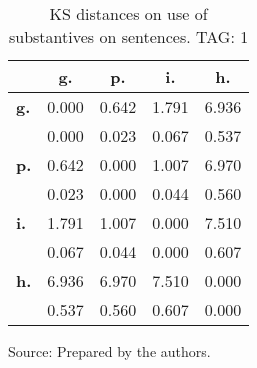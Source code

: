 \begin{table}[h!]
\begin{center}
\caption{KS distances on use of substantives on sentences. TAG: 1}
\begin{tabular}{| l || c | c | c | c |}\hline
 & {\bf g.} & {\bf p.} & {\bf i.} & {\bf h.} \\\hline\hline
{\bf g.} & 0.000 & 0.642 & 1.791 & 6.936 \\
{\bf } & 0.000 & 0.023 & 0.067 & 0.537 \\\hline
{\bf p.} & 0.642 & 0.000 & 1.007 & 6.970 \\
{\bf } & 0.023 & 0.000 & 0.044 & 0.560 \\\hline
{\bf i.} & 1.791 & 1.007 & 0.000 & 7.510 \\
{\bf } & 0.067 & 0.044 & 0.000 & 0.607 \\\hline
{\bf h.} & 6.936 & 6.970 & 7.510 & 0.000 \\
{\bf } & 0.537 & 0.560 & 0.607 & 0.000 \\\hline
\end{tabular}
\end{center}
\begin{flushleft}
		Source: Prepared by the authors.\
\end{flushleft}
\end{table}
